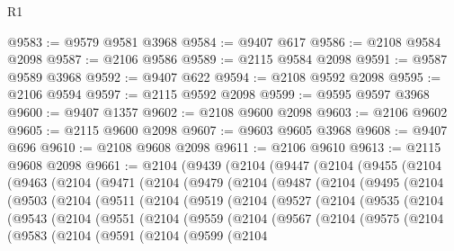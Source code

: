 \begin{lexlean}{R1}
\begin{coremodule}
@9583 := @9579 @9581 @3968
@9584 := @9407 @617
@9586 := @2108 @9584 @2098
@9587 := @2106 @9586
@9589 := @2115 @9584 @2098
@9591 := @9587 @9589 @3968
@9592 := @9407 @622
@9594 := @2108 @9592 @2098
@9595 := @2106 @9594
@9597 := @2115 @9592 @2098
@9599 := @9595 @9597 @3968
@9600 := @9407 @1357
@9602 := @2108 @9600 @2098
@9603 := @2106 @9602
@9605 := @2115 @9600 @2098
@9607 := @9603 @9605 @3968
@9608 := @9407 @696
@9610 := @2108 @9608 @2098
@9611 := @2106 @9610
@9613 := @2115 @9608 @2098
@9661 := @2104
    (@9439
      (@2104
        (@9447
          (@2104
            (@9455
              (@2104
                (@9463
                  (@2104
                    (@9471
                      (@2104
                        (@9479
                          (@2104
                            (@9487
                              (@2104
                                (@9495
                                  (@2104
                                    (@9503
                                      (@2104
                                        (@9511
                                          (@2104
                                            (@9519
                                              (@2104
                                                (@9527
                                                  (@2104
                                                    (@9535
                                                      (@2104
                                                        (@9543
                                                          (@2104
                                                            (@9551
                                                              (@2104
                                                                (@9559
                                                                  (@2104
                                                                    (@9567
                                                                      (@2104
                                                                        (@9575
                                                                          (@2104
                                                                            (@9583
                                                                              (@2104
                                                                                (@9591
                                                                                  (@2104
                                                                                    (@9599
                                                                                      (@2104

\end{coremodule}
\end{lexlean}
